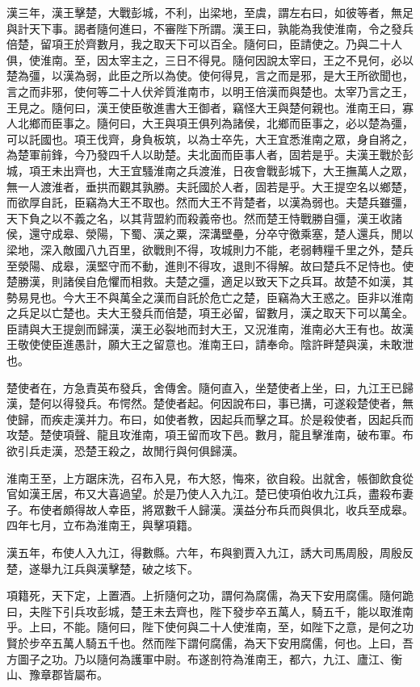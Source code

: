 漢三年，漢王擊楚，大戰彭城，不利，出梁地，至虞，謂左右曰，如彼等者，無足與計天下事。謁者隨何進曰，不審陛下所謂。漢王曰，孰能為我使淮南，令之發兵倍楚，留項王於齊數月，我之取天下可以百全。隨何曰，臣請使之。乃與二十人俱，使淮南。至，因太宰主之，三日不得見。隨何因說太宰曰，王之不見何，必以楚為彊，以漢為弱，此臣之所以為使。使何得見，言之而是邪，是大王所欲聞也，言之而非邪，使何等二十人伏斧質淮南市，以明王倍漢而與楚也。太宰乃言之王，王見之。隨何曰，漢王使臣敬進書大王御者，竊怪大王與楚何親也。淮南王曰，寡人北鄉而臣事之。隨何曰，大王與項王俱列為諸侯，北鄉而臣事之，必以楚為彊，可以託國也。項王伐齊，身負板筑，以為士卒先，大王宜悉淮南之眾，身自將之，為楚軍前鋒，今乃發四千人以助楚。夫北面而臣事人者，固若是乎。夫漢王戰於彭城，項王未出齊也，大王宜騷淮南之兵渡淮，日夜會戰彭城下，大王撫萬人之眾，無一人渡淮者，垂拱而觀其孰勝。夫託國於人者，固若是乎。大王提空名以鄉楚，而欲厚自託，臣竊為大王不取也。然而大王不背楚者，以漢為弱也。夫楚兵雖彊，天下負之以不義之名，以其背盟約而殺義帝也。然而楚王恃戰勝自彊，漢王收諸侯，還守成皋、滎陽，下蜀、漢之粟，深溝壁壘，分卒守徼乘塞，楚人還兵，閒以梁地，深入敵國八九百里，欲戰則不得，攻城則力不能，老弱轉糧千里之外，楚兵至滎陽、成皋，漢堅守而不動，進則不得攻，退則不得解。故曰楚兵不足恃也。使楚勝漢，則諸侯自危懼而相救。夫楚之彊，適足以致天下之兵耳。故楚不如漢，其勢易見也。今大王不與萬全之漢而自託於危亡之楚，臣竊為大王惑之。臣非以淮南之兵足以亡楚也。夫大王發兵而倍楚，項王必留，留數月，漢之取天下可以萬全。臣請與大王提劍而歸漢，漢王必裂地而封大王，又況淮南，淮南必大王有也。故漢王敬使使臣進愚計，願大王之留意也。淮南王曰，請奉命。陰許畔楚與漢，未敢泄也。

楚使者在，方急責英布發兵，舍傳舍。隨何直入，坐楚使者上坐，曰，九江王已歸漢，楚何以得發兵。布愕然。楚使者起。何因說布曰，事已搆，可遂殺楚使者，無使歸，而疾走漢并力。布曰，如使者教，因起兵而擊之耳。於是殺使者，因起兵而攻楚。楚使項聲、龍且攻淮南，項王留而攻下邑。數月，龍且擊淮南，破布軍。布欲引兵走漢，恐楚王殺之，故閒行與何俱歸漢。

淮南王至，上方踞床洗，召布入見，布大怒，悔來，欲自殺。出就舍，帳御飲食從官如漢王居，布又大喜過望。於是乃使人入九江。楚已使項伯收九江兵，盡殺布妻子。布使者頗得故人幸臣，將眾數千人歸漢。漢益分布兵而與俱北，收兵至成皋。四年七月，立布為淮南王，與擊項籍。

漢五年，布使人入九江，得數縣。六年，布與劉賈入九江，誘大司馬周殷，周殷反楚，遂舉九江兵與漢擊楚，破之垓下。

項籍死，天下定，上置酒。上折隨何之功，謂何為腐儒，為天下安用腐儒。隨何跪曰，夫陛下引兵攻彭城，楚王未去齊也，陛下發步卒五萬人，騎五千，能以取淮南乎。上曰，不能。隨何曰，陛下使何與二十人使淮南，至，如陛下之意，是何之功賢於步卒五萬人騎五千也。然而陛下謂何腐儒，為天下安用腐儒，何也。上曰，吾方圖子之功。乃以隨何為護軍中尉。布遂剖符為淮南王，都六，九江、廬江、衡山、豫章郡皆屬布。

